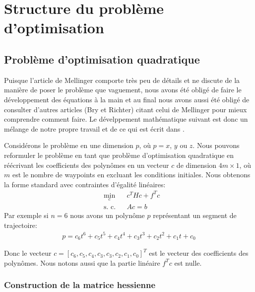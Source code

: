 \section{Structure du problème d'optimisation}

\subsection{Problème d'optimisation quadratique}

Puisque l'article de Mellinger comporte très peu de détails et ne discute de la manière de poser le problème que vaguement, nous avons été obligé de faire le développement des équations à la main et au final nous avons aussi été obligé de consulter d'autres articles (Bry et Richter) citant celui de Mellinger pour mieux comprendre comment faire. Le dévelppement mathématique suivant est donc un mélange de notre propre travail et de ce qui est écrit dans \cite{Richter2016, bry2012control}.

Considérons le problème en une dimension $p$, où $p = x$, $y$ ou $z$. Nous pouvons reformuler le problème en tant que problème d'optimisation quadratique en réécrivant les coefficients des polynômes en un vecteur $c$ de dimension $4m \times 1$, où $m$ est le nombre de waypoints en excluant les conditions initiales. Nous obtenons la forme standard avec contraintes d'égalité linéaires:
\begin{equation}\label{eq:opt_quad}
\begin{aligned}
& \underset{c}{\text{min}}
& & c^THc+f^Tc \\
& \text{s. c.}
& & Ac = b
\end{aligned}
\end{equation}
Par exemple si $n=6$ nous avons un polynôme $p$ représentant un segment de trajectoire:
\begin{align}\label{eq:polynomial}
	p = c_6 t^6 + c_5 t^5 + c_4 t^4 + c_3 t^3 + c_2 t^2 + c_1 t + c_0
\end{align}

Donc le vecteur $c = [c_6, c_5, c_4, c_3, c_3, c_2, c_1, c_0]^T$ est le vecteur des coefficients des polynômes. Nous notons aussi que la partie linéaire $f^Tc$ est nulle.

\subsubsection{Construction de la matrice hessienne}

